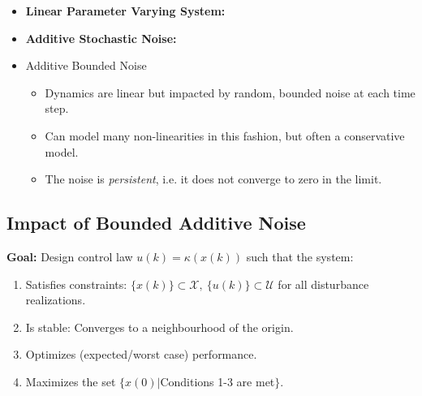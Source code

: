 \documentclass[8pt,a4paper]{scrartcl}
\begin{document}
\begin{multicols*}{3}
\begin{itemize}


\item \textbf{Linear Parameter Varying System:}


\item \textbf{Additive Stochastic Noise:}


\item Additive Bounded Noise



\begin{itemize}
\ncompaq
\item Dynamics are linear but impacted by random, bounded noise at each time step.
\item Can model many non-linearities in this fashion, but often a conservative model.
\item The noise is \emph{persistent}, i.e. it does not converge to zero in the limit.
\end{itemize}
\end{itemize}

\subsection{Impact of Bounded Additive Noise}

\textbf{Goal: }Design control law $u(k)=\kappa(x(k))$ such that the system:
\begin{enumerate}
\ncompaq
\item Satisfies constraints: $\{x(k)\}\subset\mathcal{X},\ \{u(k)\}\subset\mathcal{U}$ for all disturbance realizations.
\item Is stable: Converges to a neighbourhood of the origin.
\item Optimizes (expected/worst case) \glqq performance\grqq .
\item Maximizes the set $\{x(0)|$Conditions 1-3 are met$\}$.
\end{enumerate}


\end{multicols*}
\end{document}
